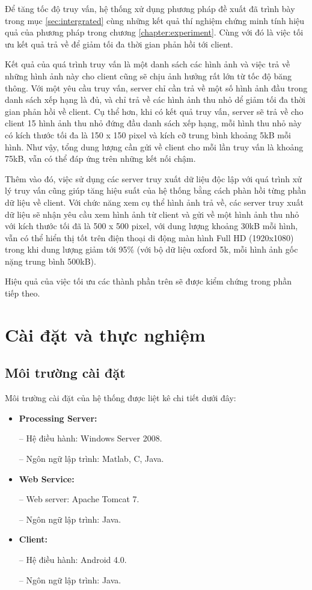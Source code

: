 \begin{itemize}
Để tăng tốc độ truy vấn, hệ thống xử dụng phương pháp đề xuất đã trình bày trong mục \ref{sec:intergrated} cùng những kết quả thí nghiệm chứng minh tính hiệu quả của phương pháp trong chương \ref{chapter:experiment}. Cùng với đó là việc tối ưu kết quả trả về để giảm tối đa thời gian phản hồi tới client.

Kết quả của quá trình truy vấn là một danh sách các hình ảnh và việc trả về những hình ảnh này cho client cũng sẽ chịu ảnh hưởng rất lớn từ tốc độ băng thông. Với một yêu cầu truy vấn, server chỉ cần trả về một số hình ảnh đầu trong danh sách xếp hạng là đủ, và chỉ trả về các hình ảnh thu nhỏ dể giảm tối đa thời gian phản hồi về client. Cụ thể hơn, khi có kết quả truy vấn, server sẽ trả về cho client 15 hình ảnh thu nhỏ đứng đầu danh sách xếp hạng, mỗi hình thu nhỏ này có kích thước tối đa là 150 x 150 pixel và kích cỡ trung bình khoảng 5kB mỗi hình. Như vậy, tổng dung lượng cần gửi về client cho mỗi lần truy vấn là khoảng 75kB, vẫn có thể đáp ứng trên những kết nối chậm. 

Thêm vào đó, việc sử dụng các server truy xuất dữ liệu độc lập với quá trình xử lý truy vấn cũng giúp tăng hiệu suất của hệ thống bằng cách phàn hồi từng phần dữ liệu về client. Với chức năng xem cụ thể hình ảnh trả về, các server truy xuất dữ liệu sẽ nhận yêu cầu xem hình ảnh từ client và gửi về một hình ảnh thu nhỏ với kích thước tối đã là 500 x 500 pixel, với dung lượng khoảng 30kB mỗi hình, vẫn có thể hiển thị tốt trên điện thoại di động màn hình Full HD (1920x1080) trong khi dung lượng giảm tới 95\% (với bộ dữ liệu oxford 5k, mỗi hình ảnh gốc nặng trung bình 500kB).

\end{itemize}

Hiệu quả của việc tối ưu các thành phần trên sẽ được kiểm chứng trong phần tiếp theo.

\section{Cài đặt và thực nghiệm}
\label{c5-caidat}
	\subsection{Môi trường cài đặt}
	Môi trường cài đặt của hệ thống được liệt kê chi tiết dưới đây:
	
	\begin{itemize}
	\item \textbf{Processing Server:}
	
	-- Hệ điều hành: Windows Server 2008.
	
	-- Ngôn ngữ lập trình: Matlab, C, Java.
	
	\item \textbf{Web Service:}
	
	-- Web server: Apache Tomcat 7.
	
	-- Ngôn ngữ lập trình: Java.
	
	\item \textbf{Client:}
	
	-- Hệ điều hành: Android 4.0.
	
	-- Ngôn ngữ lập trình: Java. 
	\end{itemize}	
	
